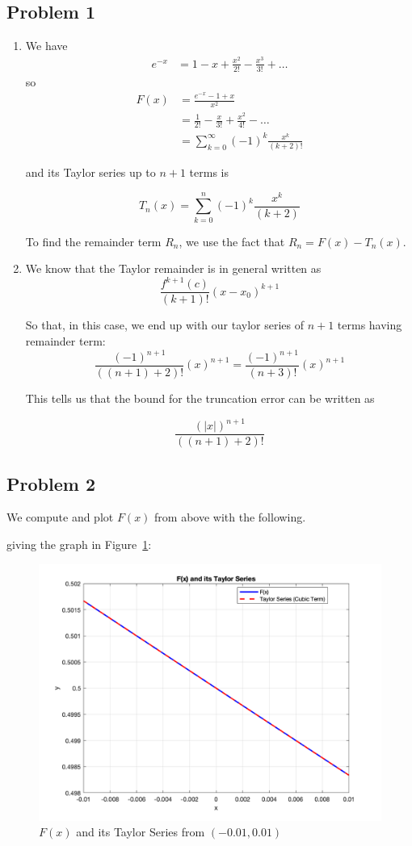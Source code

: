 \documentclass[11pt]{article}
\begin{document}
\subsection{Problem 1}
\begin{enumerate}[label=\alph*.]
  \item We have \begin{align*}
    e^{-x} &= 1 - x + \frac{x^2}{2!} - \frac{x^3}{3!} + \dots
  \end{align*}
  so
  \begin{align*}
    F(x) &= \frac{e^{-x} - 1 + x}{x^2} \\
    &= \frac{1}{2!} - \frac{x}{3!} + \frac{x^2}{4!} - \dots \\
    &= \sum_{k = 0}^\infty (-1)^k \frac{x^k}{(k + 2)!}
  \end{align*}

  and its Taylor series up to $n + 1$ terms is

  $$
  T_n(x) = \sum_{k = 0}^n (-1)^k \frac{x^k}{(k + 2)}
  $$

  To find the remainder term $R_n$, we use the fact that $R_n = F(x) - T_n(x)$. 
  \item We know that the Taylor remainder is in general written as
  $$\frac{f^{k+1}(c)}{(k+1)!}(x-x_0)^{k+1}$$

 So that, in this case, we end up with our taylor series of $n+1$ terms having remainder term:
 $$\frac{(-1)^{n+1}}{((n+1)+2)!}(x)^{n+1} = \frac{(-1)^{n+1}}{(n+3)!}(x)^{n+1}$$

 This tells us that the bound for the truncation error can be written as

 $$\frac{(|x|)^{n+1}}{((n+1)+2)!}$$
\end{enumerate}

\subsection{Problem 2}
We compute and plot $F(x)$ from above with the following.
  
  

  

giving the graph in Figure~\ref{fig:lab1b_2}:

\begin{figure}[h!]
  \centering
  \includegraphics[width=0.8\linewidth]{lab1b_2.png}
  \caption{$F(x)$ and its Taylor Series from $(-0.01, 0.01)$}
  \label{fig:lab1b_2}
\end{figure}
\end{document}
